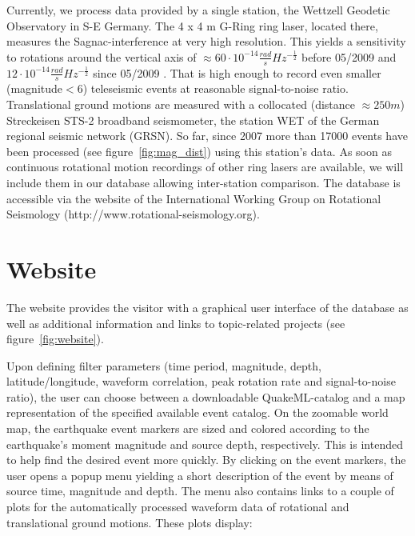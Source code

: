 \documentclass[12pt,reqno,letter]{article}
\begin{document}
Currently, we process data provided by a single station, the Wettzell Geodetic Observatory in S-E Germany. The 4 x 4 m G-Ring ring laser, located there, measures the Sagnac-interference at very high resolution. This yields a sensitivity to rotations around the vertical axis of $\approx60\cdot10^{-14}\frac{rad}{s}Hz^{-\frac{1}{2}}$ before 05/2009 and $12\cdot10^{-14}\frac{rad}{s}Hz^{-\frac{1}{2}}$ since 05/2009 \citep{Schreiber2013}. That is high enough to record even smaller (magnitude$<$6) teleseismic events at reasonable signal-to-noise ratio.
Translational ground motions are measured with a collocated (distance $\approx250m$) Streckeisen STS-2 broadband seismometer, the station WET of the German regional seismic network (GRSN). So far, since 2007 more than 17000 events have been processed (see figure~\ref{fig:mag_dist}) using this station's data. As soon as continuous rotational motion recordings of other ring lasers are available, we will include them in our database allowing inter-station comparison. The database is accessible via the website of the International Working Group on Rotational Seismology (http://www.rotational-seismology.org).\\
%
%
\section*{Website}
\label{sec:website}
The website provides the visitor with a graphical user interface of the database as well as additional information and links to topic-related projects (see figure~\ref{fig:website}).

Upon defining filter parameters (time period, magnitude, depth, latitude/longitude, waveform correlation, peak rotation rate and signal-to-noise ratio), the user can choose between a downloadable QuakeML-catalog and a map representation of the specified available event catalog. On the zoomable world map, the earthquake event markers are sized and colored according to the earthquake’s moment magnitude and source depth, respectively. This is intended to help find the desired event more quickly.
By clicking on the event markers, the user opens a popup menu yielding a short description of the event by means of source time, magnitude and depth. The menu also contains links to a couple of plots for the automatically processed waveform data of rotational and translational ground motions. These plots display:
\end{document}
